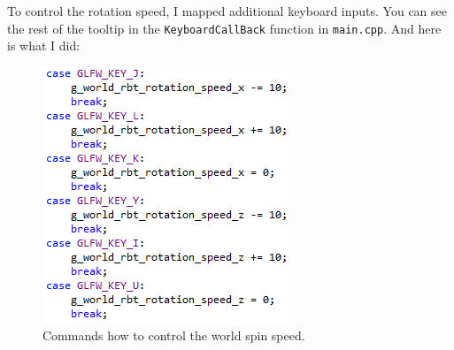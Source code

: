 \documentclass[11pt]{article}
\begin{document}
To control the rotation speed, I mapped additional keyboard inputs. You can see the rest of the tooltip in the \texttt{KeyboardCallBack} function in \texttt{main.cpp}. And here is what I did:
\begin{figure}[htb]
	\begin{center}
		\includegraphics[width=0.5\linewidth]{command2.png}
	\end{center}
	\caption{Commands how to control the world spin speed.}
\end{figure}







\end{document}
